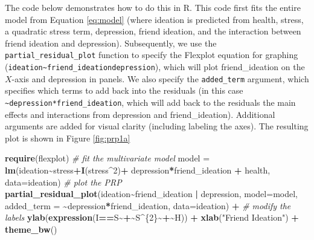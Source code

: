 \documentclass[
  man,floatsintext]{apa6}
\newenvironment{Shaded}{\begin{snugshade}}{\end{snugshade}}
\newcommand{\AttributeTok}[1]{\textcolor[rgb]{0.13,0.29,0.53}{#1}}
\newcommand{\CommentTok}[1]{\textcolor[rgb]{0.56,0.35,0.01}{\textit{#1}}}
\newcommand{\DecValTok}[1]{\textcolor[rgb]{0.00,0.00,0.81}{#1}}
\newcommand{\ErrorTok}[1]{\textcolor[rgb]{0.64,0.00,0.00}{\textbf{#1}}}
\newcommand{\FunctionTok}[1]{\textcolor[rgb]{0.13,0.29,0.53}{\textbf{#1}}}
\newcommand{\NormalTok}[1]{#1}
\newcommand{\OtherTok}[1]{\textcolor[rgb]{0.56,0.35,0.01}{#1}}
\newcommand{\SpecialCharTok}[1]{\textcolor[rgb]{0.81,0.36,0.00}{\textbf{#1}}}
\newcommand{\StringTok}[1]{\textcolor[rgb]{0.31,0.60,0.02}{#1}}
\begin{document}
The code below demonstrates how to do this in R. This code first fits the entire model from Equation \eqref{eq:model} (where ideation is predicted from health, stress, a quadratic stress term, depression, friend ideation, and the interaction between friend ideation and depression). Subsequently, we use the \texttt{partial\_residual\_plot} function to specify the Flexplot equation for graphing (\texttt{ideation\textasciitilde{}friend\_ideation\textbar{}depression}), which will plot friend\_ideation on the \(X\)-axis and depression in panels. We also specify the \texttt{added\_term} argument, which specifies which terms to add back into the residuals (in this case \texttt{\textasciitilde{}depression*friend\_ideation}, which will add back to the residuals the main effects and interactions from depression and friend\_ideation). Additional arguments are added for visual clarity (including labeling the axes). The resulting plot is shown in Figure \ref{fig:prp1a}

\begin{Shaded}
\begin{Highlighting}[]
\FunctionTok{require}\NormalTok{(flexplot)}
\CommentTok{\# fit the multivariate model}
\NormalTok{model }\OtherTok{=} \FunctionTok{lm}\NormalTok{(ideation}\SpecialCharTok{\textasciitilde{}}\NormalTok{stress}\SpecialCharTok{+}\FunctionTok{I}\NormalTok{(stress}\SpecialCharTok{\^{}}\DecValTok{2}\NormalTok{)}\SpecialCharTok{+} 
\NormalTok{             depression}\SpecialCharTok{*}\NormalTok{friend\_ideation }\SpecialCharTok{+} 
\NormalTok{             health, }
           \AttributeTok{data=}\NormalTok{ideation)}
\CommentTok{\# plot the PRP}
\FunctionTok{partial\_residual\_plot}\NormalTok{(ideation}\SpecialCharTok{\textasciitilde{}}\NormalTok{friend\_ideation }\SpecialCharTok{|}\NormalTok{ depression, }
                      \AttributeTok{model=}\NormalTok{model, }
                      \AttributeTok{added\_term =} \SpecialCharTok{\textasciitilde{}}\NormalTok{depression}\SpecialCharTok{*}\NormalTok{friend\_ideation, }
                      \AttributeTok{data=}\NormalTok{ideation) }\SpecialCharTok{+}
  \CommentTok{\# modify the labels}
  \FunctionTok{ylab}\NormalTok{(}\FunctionTok{expression}\NormalTok{(I}\SpecialCharTok{==}\NormalTok{S}\SpecialCharTok{\textasciitilde{}+}\ErrorTok{\textasciitilde{}}\NormalTok{S}\SpecialCharTok{\^{}}\NormalTok{\{}\DecValTok{2}\NormalTok{\}}\SpecialCharTok{\textasciitilde{}+}\ErrorTok{\textasciitilde{}}\NormalTok{H)) }\SpecialCharTok{+} 
  \FunctionTok{xlab}\NormalTok{(}\StringTok{"Friend Ideation"}\NormalTok{) }\SpecialCharTok{+}
  \FunctionTok{theme\_bw}\NormalTok{()}
\end{Highlighting}
\end{Shaded}
\end{document}
